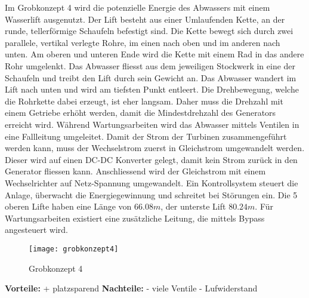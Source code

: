 Im Grobkonzept 4 wird die potenzielle Energie des Abwassers mit einem Wasserlift ausgenutzt. Der Lift besteht aus einer Umlaufenden Kette, an der runde, tellerförmige Schaufeln befestigt sind. Die Kette bewegt sich  durch zwei parallele, vertikal verlegte Rohre, im einen nach oben und im anderen nach unten. Am oberen und unteren Ende wird die Kette mit einem Rad in das andere Rohr umgelenkt. Das Abwasser fliesst aus dem jeweiligen Stockwerk in eine der Schaufeln und treibt den Lift durch sein Gewicht an. Das Abwasser wandert im Lift nach unten und wird am tiefsten Punkt entleert. Die Drehbewegung, welche die Rohrkette dabei erzeugt, ist eher langsam. Daher muss die Drehzahl mit einem Getriebe erhöht werden, damit die Mindestdrehzahl des Generators erreicht wird. Während Wartungsarbeiten wird das Abwasser mittels Ventilen in eine Fallleitung umgeleitet. Damit der Strom der Turbinen zusammengeführt werden kann, muss der Wechselstrom zuerst in Gleichstrom umgewandelt werden. Dieser wird auf einen DC-DC Konverter gelegt, damit kein Strom zurück in den Generator fliessen kann. Anschliessend wird der Gleichstrom mit einem Wechselrichter auf Netz-Spannung umgewandelt. Ein Kontrollsystem steuert die Anlage, überwacht die Energiegewinnung und schreitet bei Störungen ein. Die 5 oberen Lifte haben eine Länge von \(66.08m\), der unterste Lift \(80.24m\). Für Wartungsarbeiten existiert eine zusätzliche Leitung, die mittels Bypass angesteuert wird.
\newpage
\begin{wrapfigure}{r}{0.5\textwidth}
  \begin{center}
    \texttt{[image: grobkonzept4]}
  \end{center}
  \caption{Grobkonzept 4}
\end{wrapfigure}


\textbf{Vorteile:}							\newline
+ 	platzsparend								\newline
\newline
\textbf{Nachteile:}\newline
-	viele Ventile								\newline
-	Lufwiderstand							\newline
\WFclear			
\newpage